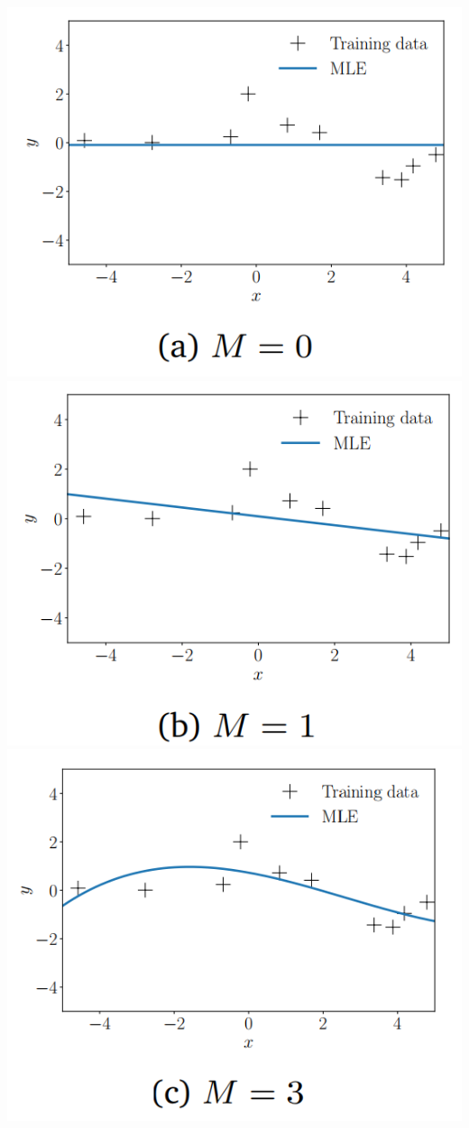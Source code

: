 \documentclass[12pt]{article}
\numberwithin{equation}{section}
\begin{document}
{\noindent
\includegraphics[scale=0.48]{graph5} 
\includegraphics[scale=0.48]{graph6}
 \includegraphics[scale=0.48]{graph7}\\
}
\end{document}
